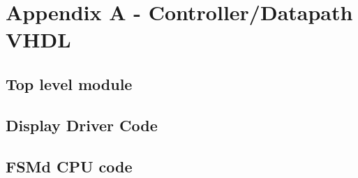 \section{Appendix A - Controller/Datapath VHDL}
\subsection{Top level module}

\subsection{Display Driver Code}









\subsection{FSMd CPU code}

